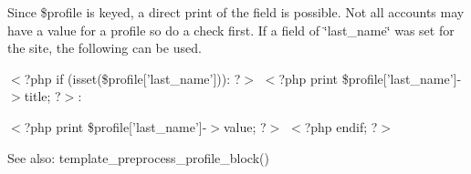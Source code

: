 Since \$profile is keyed, a direct print of the field is possible. Not all accounts may have a value for a profile so do a check first. If a field of \char`\"{}last\_\-name\char`\"{} was set for the site, the following can be used.

$<$?php if (isset(\$profile\mbox{[}'last\_\-name'\mbox{]})): ?$>$  $<$?php print \$profile\mbox{[}'last\_\-name'\mbox{]}-$>$title; ?$>$:\par
 $<$?php print \$profile\mbox{[}'last\_\-name'\mbox{]}-$>$value; ?$>$  $<$?php endif; ?$>$

\begin{Desc}
\item[See also:]template\_\-preprocess\_\-profile\_\-block() \end{Desc}

